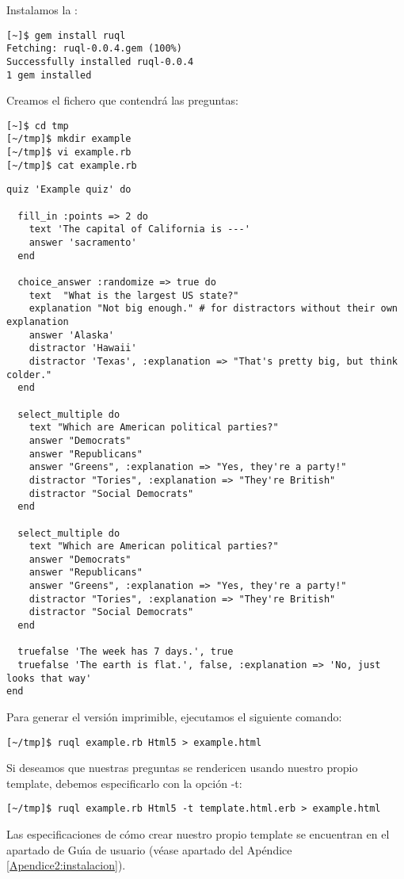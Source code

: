Instalamos la :

\begin{verbatim}
[~]$ gem install ruql
Fetching: ruql-0.0.4.gem (100%)
Successfully installed ruql-0.0.4
1 gem installed
\end{verbatim}

Creamos el fichero  que contendr\'a las preguntas:

\begin{verbatim}
[~]$ cd tmp
[~/tmp]$ mkdir example
[~/tmp]$ vi example.rb
[~/tmp]$ cat example.rb 
\end{verbatim}

\begin{lstlisting}
quiz 'Example quiz' do
  
  fill_in :points => 2 do
    text 'The capital of California is ---'
    answer 'sacramento'
  end
  
  choice_answer :randomize => true do
    text  "What is the largest US state?"
    explanation "Not big enough." # for distractors without their own explanation
    answer 'Alaska'
    distractor 'Hawaii'
    distractor 'Texas', :explanation => "That's pretty big, but think colder."
  end
  
  select_multiple do
    text "Which are American political parties?"
    answer "Democrats"
    answer "Republicans"
    answer "Greens", :explanation => "Yes, they're a party!"
    distractor "Tories", :explanation => "They're British"
    distractor "Social Democrats"
  end
  
  select_multiple do
    text "Which are American political parties?"
    answer "Democrats"
    answer "Republicans"
    answer "Greens", :explanation => "Yes, they're a party!"
    distractor "Tories", :explanation => "They're British"
    distractor "Social Democrats"
  end
  
  truefalse 'The week has 7 days.', true
  truefalse 'The earth is flat.', false, :explanation => 'No, just looks that way'
end
\end{lstlisting}
\bigskip

Para generar el  versi\'on imprimible, ejecutamos el siguiente comando:

\begin{verbatim}
[~/tmp]$ ruql example.rb Html5 > example.html
\end{verbatim}

Si deseamos que nuestras preguntas se rendericen usando nuestro propio template, debemos especificarlo con la opci\'on -t:

\begin{verbatim}
[~/tmp]$ ruql example.rb Html5 -t template.html.erb > example.html
\end{verbatim}

Las especificaciones de c\'omo crear nuestro propio template se encuentran en el apartado de Gu\'{\i}a de usuario (v\'ease apartado del Ap\'endice \ref{Apendice2:instalacion}).